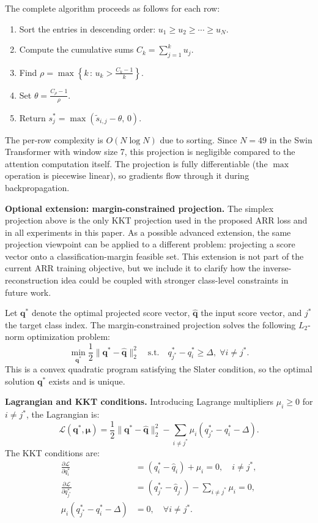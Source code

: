 \documentclass[review,12pt,authoryear]{elsarticle}
\newcommand{\method}{ARR}
\begin{document}
The complete algorithm proceeds as follows for each row:
\begin{enumerate}
    \item Sort the entries in descending order: $u_1 \geq u_2 \geq \cdots \geq u_N$.
    \item Compute the cumulative sums $C_k = \sum_{j=1}^{k} u_j$.
    \item Find $\rho = \max\left\{k \,:\, u_k > \frac{C_k - 1}{k}\right\}$.
    \item Set $\theta = \frac{C_\rho - 1}{\rho}$.
    \item Return $s_j^* = \max(\tilde{s}_{i,j} - \theta, \, 0)$.
\end{enumerate}
The per-row complexity is $O(N \log N)$ due to sorting.
Since $N = 49$ in the Swin Transformer with window size 7, this projection is negligible compared to the attention computation itself.
The projection is fully differentiable (the $\max$ operation is piecewise linear), so gradients flow through it during backpropagation.

\textbf{Optional extension: margin-constrained projection.}
The simplex projection above is the only KKT projection used in the proposed \method{} loss and in all experiments in this paper.
As a possible advanced extension, the same projection viewpoint can be applied to a different problem: projecting a score vector onto a classification-margin feasible set.
This extension is not part of the current \method{} training objective, but we include it to clarify how the inverse-reconstruction idea could be coupled with stronger class-level constraints in future work.

Let $\mathbf{q}^*$ denote the optimal projected score vector, $\hat{\mathbf{q}}$ the input score vector, and $j^*$ the target class index.
The margin-constrained projection solves the following $L_2$-norm optimization problem:
\begin{equation}
    \min_{\mathbf{q}^*} \frac{1}{2}\|\mathbf{q}^* - \hat{\mathbf{q}}\|_2^2 \quad \text{s.t.} \quad q_{j^*}^* - q_i^* \geq \Delta, \; \forall i \neq j^*.
    \label{eq:kkt_obj}
\end{equation}
This is a convex quadratic program satisfying the Slater condition, so the optimal solution $\mathbf{q}^*$ exists and is unique.

\textbf{Lagrangian and KKT conditions.}
Introducing Lagrange multipliers $\mu_i \geq 0$ for $i \neq j^*$, the Lagrangian is:
\begin{equation}
    \mathcal{L}(\mathbf{q}^*, \bm{\mu}) = \frac{1}{2}\|\mathbf{q}^* - \hat{\mathbf{q}}\|_2^2 - \sum_{i \neq j^*} \mu_i(q_{j^*}^* - q_i^* - \Delta).
    \label{eq:kkt_lagrangian}
\end{equation}
The KKT conditions are:
\begin{align}
    \frac{\partial \mathcal{L}}{\partial q_i^*} &= (q_i^* - \hat{q}_i) + \mu_i = 0, \quad i \neq j^*, \label{eq:kkt_stat_i} \\
    \frac{\partial \mathcal{L}}{\partial q_{j^*}^*} &= (q_{j^*}^* - \hat{q}_{j^*}) - \sum_{i \neq j^*} \mu_i = 0, \label{eq:kkt_stat_j} \\
    \mu_i(q_{j^*}^* - q_i^* - \Delta) &= 0, \quad \forall i \neq j^*. \label{eq:kkt_comp}
\end{align}
\end{document}
